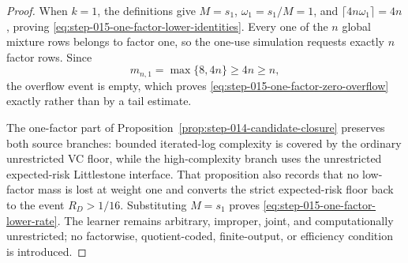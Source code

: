 \begin{proof}
When \(k=1\), the definitions give \(M=s_1\),
\(\omega_1=s_1/M=1\), and
\(\lceil4n\omega_1\rceil=4n\), proving
\eqref{eq:step-015-one-factor-lower-identities}.  Every one of the
\(n\) global mixture rows belongs to factor one, so the one-use
simulation requests exactly \(n\) factor rows.  Since
\begin{equation}\label{eq:step-015-one-factor-budget-chain}
m_{n,1}=\max\{8,4n\}\ge4n\ge n,
\end{equation}
the overflow event is empty, which proves
\eqref{eq:step-015-one-factor-zero-overflow} exactly rather than by a
tail estimate.

The one-factor part of
Proposition~\ref{prop:step-014-candidate-closure} preserves both source
branches: bounded iterated-log complexity is covered by the ordinary
unrestricted VC floor, while the high-complexity branch uses the
unrestricted expected-risk Littlestone interface.  That proposition
also records that no low-factor mass is lost at weight one and converts
the strict expected-risk floor back to the event \(R_D>1/16\).
Substituting \(M=s_1\) proves
\eqref{eq:step-015-one-factor-lower-rate}.  The learner remains
arbitrary, improper, joint, and computationally unrestricted; no
factorwise, quotient-coded, finite-output, or efficiency condition is
introduced.
\end{proof}


